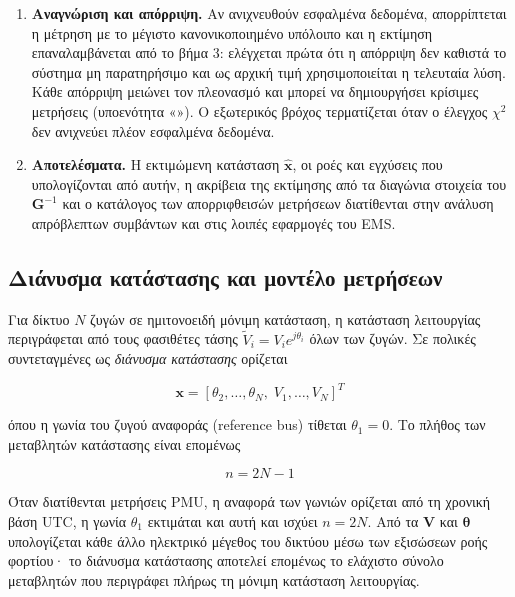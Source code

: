 \begin{enumerate}
      $\chi^2$.
\item \textbf{Αναγνώριση και απόρριψη.} Αν ανιχνευθούν εσφαλμένα δεδομένα, απορρίπτεται η
      μέτρηση με το μέγιστο κανονικοποιημένο υπόλοιπο και η εκτίμηση επαναλαμβάνεται από το
      βήμα 3: ελέγχεται πρώτα ότι η απόρριψη δεν καθιστά το σύστημα μη παρατηρήσιμο και ως
      αρχική τιμή χρησιμοποιείται η τελευταία λύση. Κάθε απόρριψη μειώνει τον πλεονασμό
      και μπορεί να δημιουργήσει κρίσιμες μετρήσεις (υποενότητα «»). Ο εξωτερικός
      βρόχος τερματίζεται όταν ο έλεγχος $\chi^2$ δεν ανιχνεύει πλέον εσφαλμένα δεδομένα.
\item \textbf{Αποτελέσματα.} Η εκτιμώμενη κατάσταση $\hat{\mathbf{x}}$, οι ροές και εγχύσεις
      που υπολογίζονται από αυτήν, η ακρίβεια της εκτίμησης από τα διαγώνια στοιχεία του
      $\mathbf{G}^{-1}$ και ο κατάλογος των απορριφθεισών μετρήσεων διατίθενται στην ανάλυση
      απρόβλεπτων συμβάντων και στις λοιπές εφαρμογές του EMS.
\end{enumerate}

\subsection{Διάνυσμα κατάστασης και μοντέλο μετρήσεων}

Για δίκτυο $N$ ζυγών σε ημιτονοειδή μόνιμη κατάσταση, η κατάσταση λειτουργίας περιγράφεται από
τους φασιθέτες τάσης $\tilde{V}_i = V_i e^{j\theta_i}$ όλων των ζυγών. Σε πολικές συντεταγμένες
ως \emph{διάνυσμα κατάστασης} ορίζεται

\begin{equation}
\mathbf{x} = \left[\theta_2, \ldots, \theta_N,\; V_1, \ldots, V_N\right]^{T}
\label{eq:statevec}
\end{equation}

όπου η γωνία του ζυγού αναφοράς (reference bus) τίθεται $\theta_1 = 0$. Το πλήθος των
μεταβλητών κατάστασης είναι επομένως

\begin{equation}
n = 2N - 1
\label{eq:nstates}
\end{equation}

Όταν διατίθενται μετρήσεις PMU, η αναφορά των γωνιών ορίζεται από τη χρονική βάση UTC, η
γωνία $\theta_1$ εκτιμάται και αυτή και ισχύει $n = 2N$. Από τα $\mathbf{V}$ και
$\boldsymbol{\theta}$ υπολογίζεται κάθε άλλο ηλεκτρικό μέγεθος του δικτύου μέσω των εξισώσεων
ροής φορτίου· το διάνυσμα κατάστασης αποτελεί επομένως το ελάχιστο σύνολο μεταβλητών που
περιγράφει πλήρως τη μόνιμη κατάσταση λειτουργίας.


